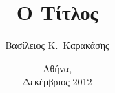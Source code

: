 \documentclass[greek]{cslabthesis}
\author{Βασίλειος Κ.\ Καρακάσης}
\title{Ο Τίτλος}
\date{Αθήνα, \\ Δεκέμβριος 2012}
\begin{document}
\maketitle




\frontmatter
\tableofcontents

\cleardoublepage
\listoffigures

\cleardoublepage
\listoftables

\cleardoublepage
\listofalgorithms



\mainmatter


\backmatter

\cleardoublepage
\printindex
\end{document}
